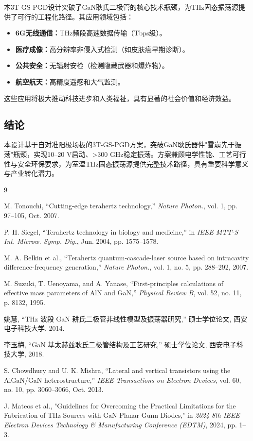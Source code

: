 \documentclass[12pt,a4paper]{article}
\begin{document}
本3T-GS-PGD设计突破了GaN耿氏二极管的核心技术瓶颈，为THz固态振荡源提供了可行的工程化路径。其应用领域包括：

\begin{itemize}
    \item \textbf{6G无线通信：}THz频段高速数据传输（Tbps级）。
    \item \textbf{医疗成像：}高分辨率非侵入式检测（如皮肤癌早期诊断）。
    \item \textbf{公共安全：}无辐射安检（检测隐藏武器和爆炸物）。
    \item \textbf{航空航天：}高精度遥感和大气监测。
\end{itemize}

这些应用将极大推动科技进步和人类福祉，具有显著的社会价值和经济效益。

\subsection{结论}

本设计基于自对准阳极场板的3T-GS-PGD方案，突破GaN耿氏器件"雪崩先于振荡"瓶颈，实现10--20 V启动、>300 GHz稳定振荡。方案兼顾电学性能、工艺可行性与安全环保要求，为室温THz固态振荡源提供完整技术路径，具有重要科学意义与产业转化潜力。

\clearpage

\begin{thebibliography}{9}

M. Tonouchi, ``Cutting-edge terahertz technology,'' \emph{Nature Photon.}, vol. 1, pp. 97--105, Oct. 2007.

P. H. Siegel, ``Terahertz technology in biology and medicine,'' in \emph{IEEE MTT-S Int. Microw. Symp. Dig.}, Jun. 2004, pp. 1575--1578.

M. A. Belkin et al., ``Terahertz quantum-cascade-laser source based on intracavity difference-frequency generation,'' \emph{Nature Photon.}, vol. 1, no. 5, pp. 288--292, 2007.

M. Suzuki, T. Uenoyama, and A. Yanase, ``First-principles calculations of effective mass parameters of AlN and GaN,'' \emph{Physical Review B}, vol. 52, no. 11, p. 8132, 1995.

姚慧, ``THz 波段 GaN 耕氏二极管非线性模型及振荡器研究,'' 硕士学位论文, 西安电子科技大学, 2014.

李玉梅, ``GaN 基太赫兹耿氏二极管结构及工艺研究,'' 硕士学位论文, 西安电子科技大学, 2018.

S. Chowdhury and U. K. Mishra, ``Lateral and vertical transistors using the AlGaN/GaN heterostructure,'' \emph{IEEE Transactions on Electron Devices}, vol. 60, no. 10, pp. 3060--3066, Oct. 2013.

J. Mateos et al., "Guidelines for Overcoming the Practical Limitations for the Fabrication of THz Sources with GaN Planar Gunn Diodes," in \emph{2024 8th IEEE Electron Devices Technology \& Manufacturing Conference (EDTM)}, 2024, pp. 1--3.

\end{thebibliography}
\end{document}
